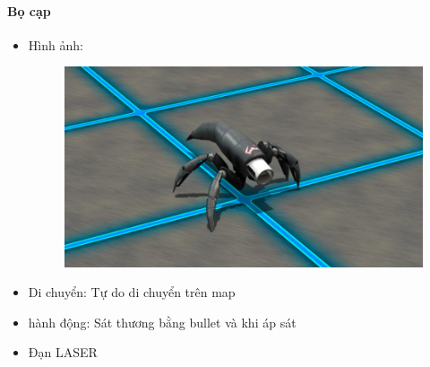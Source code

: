 \documentclass[../report.tex]{subfiles}
\begin{document}
\paragraph{Bọ cạp}
\begin{itemize}
\item Hình ảnh:
\begin{figure}[H]
\centering
\includegraphics[width=12cm]{figures/bocap.png}
\end{figure}

\item Di chuyển: Tự do di chuyển trên map
\item hành động: Sát thương bằng bullet và khi áp sát
\item Đạn LASER
\end{itemize}
\end{document}
